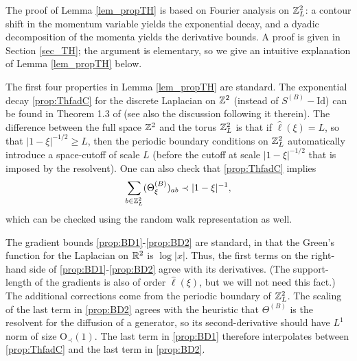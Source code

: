 {The proof of Lemma \ref{lem_propTH} is based on Fourier analysis on $\mathbb{Z}_{L}^{2}$: a contour shift in the momentum variable yields the exponential decay, and a dyadic decomposition of the momenta yields the derivative bounds. A proof is given in Section \ref{sec_TH}; the argument is elementary, so we give an intuitive explanation of Lemma \ref{lem_propTH} below.

The first four properties in Lemma \ref{lem_propTH} are standard. The exponential decay \eqref{prop:ThfadC} for the discrete Laplacian on $\mathbb{Z}^{2}$ (instead of $S^{(B)}-\mathrm{Id}$) can be found in Theorem 1.3 of \cite{MS22} (see also the discussion following it therein). The difference between the full space $\mathbb{Z}^{2}$ and the torus $\mathbb{Z}_{L}^{2}$ is that if $\hat{\ell}(\xi)=L$, so that $|1-\xi|^{-1/2}\geq L$, then the periodic boundary conditions on $\mathbb{Z}_{L}^{2}$ automatically introduce a space-cutoff of scale $L$ (before the cutoff at scale $|1-\xi|^{-1/2}$ that is imposed by the resolvent). One can also check that \eqref{prop:ThfadC} implies 
%
\begin{align*}
\sum_{b\in\mathbb{Z}_{L}^{2}}(\Theta^{(B)}_{\xi})_{ab}\prec|1-\xi|^{-1},
\end{align*}
%
which can be checked using the random walk representation as well. 

The gradient bounds \eqref{prop:BD1}-\eqref{prop:BD2} are standard, in that the Green's function for the Laplacian on $\mathbb{R}^{2}$ is $\log|x|$. Thus, the first terms on the right-hand side of \eqref{prop:BD1}-\eqref{prop:BD2} agree with its derivatives. (The support-length of the gradients is also of order $\hat{\ell}(\xi)$, but we will not need this fact.) The additional corrections come from the periodic boundary of $\mathbb{Z}_{L}^{2}$. The scaling of the last term in \eqref{prop:BD2} agrees with the heuristic that $\Theta^{(B)}$ is the resolvent for the diffusion of a generator, so its second-derivative should have $L^{1}$ norm of size $\mathrm{O}_{\prec}(1)$. The last term in \eqref{prop:BD1} therefore interpolates between \eqref{prop:ThfadC} and the last term in \eqref{prop:BD2}.}


